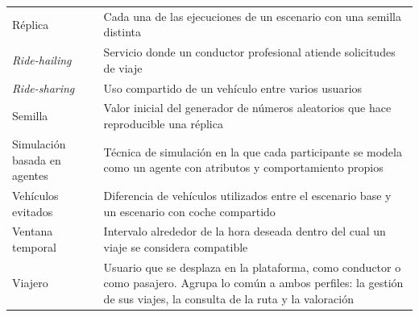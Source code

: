 \begin{longtable}{p{3.5cm} p{11.66cm}}
  Réplica & Cada una de las ejecuciones de un escenario con una semilla distinta \\
  \textit{Ride-hailing} & Servicio donde un conductor profesional atiende solicitudes de viaje \\
  \textit{Ride-sharing} & Uso compartido de un vehículo entre varios usuarios \\
  Semilla & Valor inicial del generador de números aleatorios que hace reproducible una réplica \\
  Simulación basada en agentes & Técnica de simulación en la que cada participante se modela como un agente con atributos y comportamiento propios \\
  Vehículos evitados & Diferencia de vehículos utilizados entre el escenario base y un escenario con coche compartido \\
  Ventana temporal & Intervalo alrededor de la hora deseada dentro del cual un viaje se considera compatible \\
  Viajero & Usuario que se desplaza en la plataforma, como conductor o como pasajero. Agrupa lo común a ambos perfiles: la gestión de sus viajes, la consulta de la ruta y la valoración \\
  \hline
\end{longtable}
